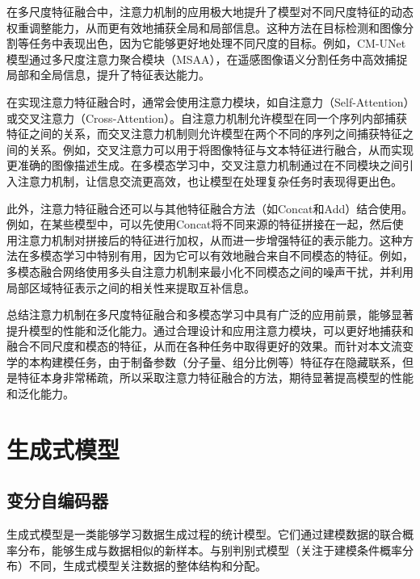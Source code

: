 在多尺度特征融合中，注意力机制的应用极大地提升了模型对不同尺度特征的动态权重调整能力，从而更有效地捕获全局和局部信息。这种方法在目标检测和图像分割等任务中表现出色，因为它能够更好地处理不同尺度的目标。例如，CM-UNet模型通过多尺度注意力聚合模块（MSAA），在遥感图像语义分割任务中高效捕捉局部和全局信息，提升了特征表达能力\cite{liu2024cm}。

在实现注意力特征融合时，通常会使用注意力模块，如自注意力（Self-Attention）或交叉注意力（Cross-Attention）。自注意力机制允许模型在同一个序列内部捕获特征之间的关系，而交叉注意力机制则允许模型在两个不同的序列之间捕获特征之间的关系。例如，交叉注意力可以用于将图像特征与文本特征进行融合，从而实现更准确的图像描述生成。在多模态学习中，交叉注意力机制通过在不同模块之间引入注意力机制，让信息交流更高效，也让模型在处理复杂任务时表现得更出色\cite{rong2023dynstatf}。

此外，注意力特征融合还可以与其他特征融合方法（如Concat和Add）结合使用。例如，在某些模型中，可以先使用Concat将不同来源的特征拼接在一起，然后使用注意力机制对拼接后的特征进行加权，从而进一步增强特征的表示能力。这种方法在多模态学习中特别有用，因为它可以有效地融合来自不同模态的特征。例如，多模态融合网络使用多头自注意力机制来最小化不同模态之间的噪声干扰，并利用局部区域特征表示之间的相关性来提取互补信息\cite{nagrani2021attention}。

总结注意力机制在多尺度特征融合和多模态学习中具有广泛的应用前景，能够显著提升模型的性能和泛化能力。通过合理设计和应用注意力模块，可以更好地捕获和融合不同尺度和模态的特征，从而在各种任务中取得更好的效果。而针对本文流变学的本构建模任务，由于制备参数（分子量、组分比例等）特征存在隐藏联系，但是特征本身非常稀疏，所以采取注意力特征融合的方法，期待显著提高模型的性能和泛化能力。
\section{生成式模型}
\subsection{变分自编码器}
生成式模型是一类能够学习数据生成过程的统计模型。它们通过建模数据的联合概率分布，能够生成与数据相似的新样本。与别判别式模型（关注于建模条件概率分布）不同，生成式模型关注数据的整体结构和分配。


